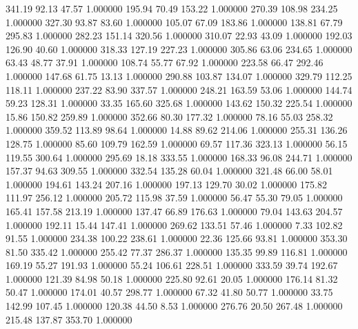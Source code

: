     341.19     92.13     47.57  1.000000
    195.94     70.49    153.22  1.000000
    270.39    108.98    234.25  1.000000
    327.30     93.87     83.60  1.000000
    105.07     67.09    183.86  1.000000
    138.81     67.79    295.83  1.000000
    282.23    151.14    320.56  1.000000
    310.07     22.93     43.09  1.000000
    192.03    126.90     40.60  1.000000
    318.33    127.19    227.23  1.000000
    305.86     63.06    234.65  1.000000
     63.43     48.77     37.91  1.000000
    108.74     55.77     67.92  1.000000
    223.58     66.47    292.46  1.000000
    147.68     61.75     13.13  1.000000
    290.88    103.87    134.07  1.000000
    329.79    112.25    118.11  1.000000
    237.22     83.90    337.57  1.000000
    248.21    163.59     53.06  1.000000
    144.74     59.23    128.31  1.000000
     33.35    165.60    325.68  1.000000
    143.62    150.32    225.54  1.000000
     15.86    150.82    259.89  1.000000
    352.66     80.30    177.32  1.000000
     78.16     55.03    258.32  1.000000
    359.52    113.89     98.64  1.000000
     14.88     89.62    214.06  1.000000
    255.31    136.26    128.75  1.000000
     85.60    109.79    162.59  1.000000
     69.57    117.36    323.13  1.000000
     56.15    119.55    300.64  1.000000
    295.69     18.18    333.55  1.000000
    168.33     96.08    244.71  1.000000
    157.37     94.63    309.55  1.000000
    332.54    135.28     60.04  1.000000
    321.48     66.00     58.01  1.000000
    194.61    143.24    207.16  1.000000
    197.13    129.70     30.02  1.000000
    175.82    111.97    256.12  1.000000
    205.72    115.98     37.59  1.000000
     56.47     55.30     79.05  1.000000
    165.41    157.58    213.19  1.000000
    137.47     66.89    176.63  1.000000
     79.04    143.63    204.57  1.000000
    192.11     15.44    147.41  1.000000
    269.62    133.51     57.46  1.000000
      7.33    102.82     91.55  1.000000
    234.38    100.22    238.61  1.000000
     22.36    125.66     93.81  1.000000
    353.30     81.50    335.42  1.000000
    255.42     77.37    286.37  1.000000
    135.35     99.89    116.81  1.000000
    169.19     55.27    191.93  1.000000
     55.24    106.61    228.51  1.000000
    333.59     39.74    192.67  1.000000
    121.39     84.98     50.18  1.000000
    225.80     92.61     20.05  1.000000
    176.14     81.32     50.47  1.000000
    174.01     40.57    298.77  1.000000
     67.32     41.80     50.77  1.000000
     33.75    142.99    107.45  1.000000
    120.38     44.50      8.53  1.000000
    276.76     20.50    267.48  1.000000
    215.48    137.87    353.70  1.000000
